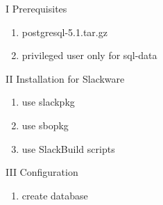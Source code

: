 \documentclass[letterpaper,10pt,english]{sphinxmanual}
\begin{document}
I Prerequisites
\begin{enumerate}
\item {} 
postgresql-5.1.tar.gz

\item {} 
privileged user only for sql-data

\end{enumerate}

II Installation for Slackware
\begin{enumerate}
\item {} 
use slackpkg

\item {} 
use sbopkg

\item {} 
use SlackBuild scripts

\end{enumerate}

III Configuration
\begin{enumerate}
\item {} 
create database

\end{enumerate}
\end{document}
